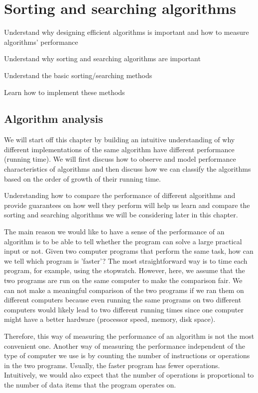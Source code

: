 \chapter{Sorting and searching algorithms}

\begin{goals}
\item Understand why designing efficient algorithms is important and how to measure algorithms' performance
\item Understand why sorting and searching algorithms are important
\item Understand the basic sorting/searching methods
\item Learn how to implement these methods
\end{goals}

 \section{Algorithm analysis}
 
 We will start off this chapter by building an intuitive understanding of why different implementations of the same algorithm have different performance (running time). We will first discuss how to observe and model performance characteristics of algorithms and then discuss how we can classify the algorithms based on the order of growth of their running time. 

Understanding how to compare the performance of different algorithms and provide guarantees on how well they perform will help us learn and compare the sorting and searching algorithms we will be considering later in this chapter. 


The main reason we would like to have a sense of the performance of an algorithm is to be able to tell whether the program can solve a large practical input or not. Given two computer programs that perform the same task, how can we tell which program is 'faster'? The most straightforward way is to time each program, for example, using the stopwatch. However, here, we assume that the two programs are run on the same computer to make the comparison fair. We can not make a meaningful comparison of the two programs if we ran them on different computers because even running the same programs on two different computers would likely lead to two different running times since one computer might have a better hardware (processor speed, memory, disk space). 

Therefore, this way of measuring the performance of an algorithm is not the most convenient one. Another way of measuring the performance independent of the type of computer we use is by counting the number of instructions or operations in the two programs. Usually, the faster program has fewer operations. Intuitively, we would also expect that the number of operations is proportional to the number of data items that the program operates on. 



